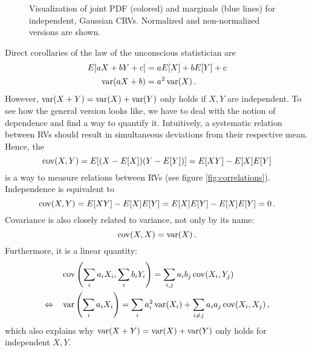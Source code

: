 \begin{figure}
\centering


%
\hspace{0.04\textwidth}%
%


\caption{Visualization of joint PDF (colored) and marginals (blue lines) for independent, Gaussian CRVs. Normalized and non-normalized versions are shown.}
\label{fig:joint_marginal_PDF}
\end{figure}



Direct corollaries of the law of the unconscious statistician are
\begin{align}
E[a X + b Y + c] &= a E[X] + b E[Y] + c
\\
\operatorname{var}(a X + b) &= a^2 \operatorname{var}(X) \, .
\end{align}
However, $\operatorname{var}(X + Y) = \operatorname{var}(X) + \operatorname{var}(Y)$ only holds if $X, Y$ are independent. To see how the general version looks like, we have to deal with the notion of dependence and find a way to quantify it. Intuitively, a systematic relation between RVs should result in simultaneous deviations from their respective mean. Hence, the 
\begin{equation}
\operatorname{cov}(X, Y) = E[(X - E[X]) (Y - E[Y])] = E[X Y] - E[X] E[Y]
\end{equation}
is a way to measure relations between RVs (see figure \ref{fig:correlations}). Independence is equivalent to
\begin{equation}
\operatorname{cov}(X, Y) = E[X Y] - E[X] E[Y] = E[X] E[Y] - E[X] E[Y] = 0 \, .
\end{equation}
Covariance is also closely related to variance, not only by its name:
\begin{equation}
\operatorname{cov}(X, X) = \operatorname{var}(X) \, .
\end{equation}
Furthermore, it is a linear quantity:
\begin{equation}
\begin{split}
&\operatorname{cov}\qty(\sum_i a_i X_i, \sum_i b_i Y_i) = \sum_{i, j} a_i b_j \operatorname{cov}(X_i, Y_j)
\\
\Leftrightarrow \quad &\operatorname{var}\qty(\sum_i a_i X_i) = \sum_i a_i^2 \operatorname{var}(X_i) + \sum_{i \neq j} a_i a_j \operatorname{cov}(X_i, X_j) \, ,
\end{split}
\end{equation}
which also explains why $\operatorname{var}(X + Y) = \operatorname{var}(X) + \operatorname{var}(Y)$ only holds for independent $X, Y$.\\


